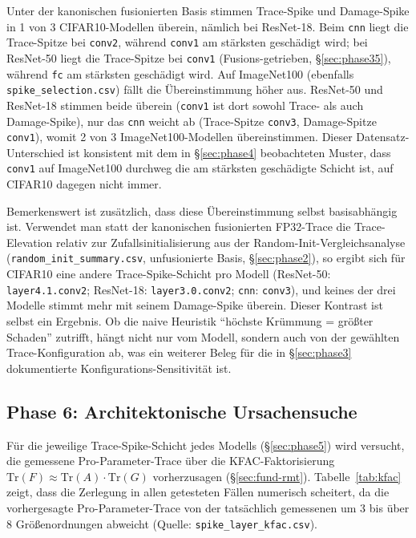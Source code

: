 Unter der kanonischen fusionierten Basis stimmen Trace-Spike und Damage-Spike in 1 von 3 CIFAR10-Modellen überein, nämlich bei ResNet-18. Beim \texttt{cnn} liegt die Trace-Spitze bei \texttt{conv2}, während \texttt{conv1} am stärksten geschädigt wird; bei ResNet-50 liegt die Trace-Spitze bei \texttt{conv1} (Fusions-getrieben, \S\ref{sec:phase35}), während \texttt{fc} am stärksten geschädigt wird. Auf ImageNet100 (ebenfalls \texttt{spike\_selection.csv}) fällt die Übereinstimmung höher aus. ResNet-50 und ResNet-18 stimmen beide überein (\texttt{conv1} ist dort sowohl Trace- als auch Damage-Spike), nur das \texttt{cnn} weicht ab (Trace-Spitze \texttt{conv3}, Damage-Spitze \texttt{conv1}), womit 2 von 3 ImageNet100-Modellen übereinstimmen. Dieser Datensatz-Unterschied ist konsistent mit dem in \S\ref{sec:phase4} beobachteten Muster, dass \texttt{conv1} auf ImageNet100 durchweg die am stärksten geschädigte Schicht ist, auf CIFAR10 dagegen nicht immer.
\par\medskip

Bemerkenswert ist zusätzlich, dass diese Übereinstimmung selbst basisabhängig ist. Verwendet man statt der kanonischen fusionierten FP32-Trace die Trace-Elevation relativ zur Zufallsinitialisierung aus der Random-Init-Vergleichsanalyse (\texttt{random\_init\_summary.csv}, unfusionierte Basis, \S\ref{sec:phase2}), so ergibt sich für CIFAR10 eine andere Trace-Spike-Schicht pro Modell (ResNet-50: \texttt{layer4.1.conv2}; ResNet-18: \texttt{layer3.0.conv2}; \texttt{cnn}: \texttt{conv3}), und keines der drei Modelle stimmt mehr mit seinem Damage-Spike überein. Dieser Kontrast ist selbst ein Ergebnis. Ob die naive Heuristik \enquote{höchste Krümmung = größter Schaden} zutrifft, hängt nicht nur vom Modell, sondern auch von der gewählten Trace-Konfiguration ab, was ein weiterer Beleg für die in \S\ref{sec:phase3} dokumentierte Konfigurations-Sensitivität ist.

\subsection{Phase 6: Architektonische Ursachensuche}
\label{sec:phase6}

Für die jeweilige Trace-Spike-Schicht jedes Modells (\S\ref{sec:phase5}) wird versucht, die gemessene Pro-Parameter-Trace über die KFAC-Faktorisierung $\mathrm{Tr}(F)\approx\mathrm{Tr}(A)\cdot\mathrm{Tr}(G)$ vorherzusagen (\S\ref{sec:fund-rmt}). Tabelle~\ref{tab:kfac} zeigt, dass die Zerlegung in allen getesteten Fällen numerisch scheitert, da die vorhergesagte Pro-Parameter-Trace von der tatsächlich gemessenen um 3 bis über 8 Größenordnungen abweicht (Quelle: \texttt{spike\_layer\_kfac.csv}).

